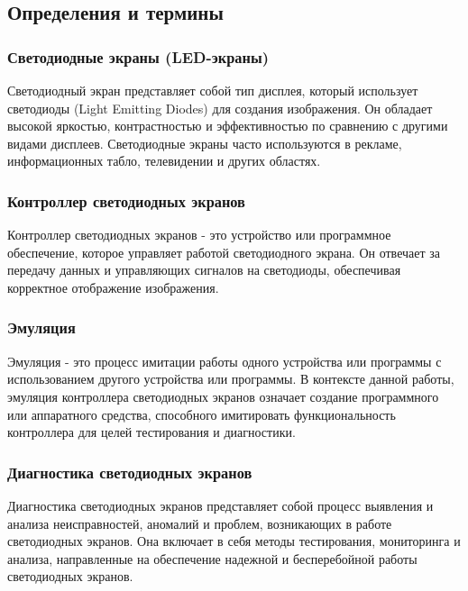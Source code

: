 \subsection{Определения и термины}

\subsubsection{Светодиодные экраны (LED-экраны)}

Светодиодный экран \cite{led_wiki} представляет собой тип дисплея, который использует светодиоды (Light Emitting Diodes) для создания изображения. Он обладает высокой яркостью, контрастностью и эффективностью по сравнению с другими видами дисплеев. Светодиодные экраны часто используются в рекламе, информационных табло, телевидении и других областях.

\subsubsection{Контроллер светодиодных экранов}

Контроллер светодиодных экранов \cite{nova_manual} - это устройство или программное обеспечение, которое управляет работой светодиодного экрана. Он отвечает за передачу данных и управляющих сигналов на светодиоды, обеспечивая корректное отображение изображения.

\subsubsection{Эмуляция}

Эмуляция - это процесс имитации работы одного устройства или программы с использованием другого устройства или программы. В контексте данной работы, эмуляция контроллера светодиодных экранов означает создание программного или аппаратного средства, способного имитировать функциональность контроллера для целей тестирования и диагностики.

\subsubsection{Диагностика светодиодных экранов}

Диагностика светодиодных экранов представляет собой процесс выявления и анализа неисправностей, аномалий и проблем, возникающих в работе светодиодных экранов. Она включает в себя методы тестирования, мониторинга и анализа, направленные на обеспечение надежной и бесперебойной работы светодиодных экранов.


